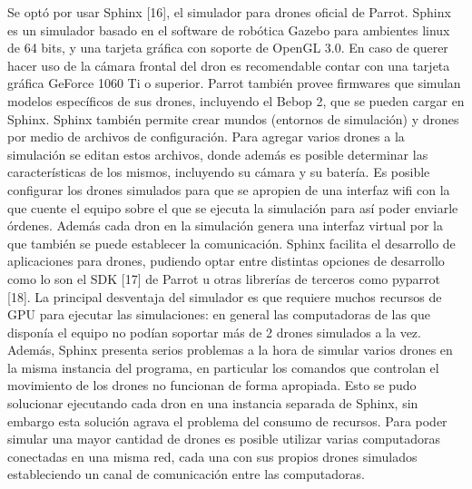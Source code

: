 Se optó por usar Sphinx [16], el simulador para drones oficial de Parrot. Sphinx es un simulador basado en el software de robótica Gazebo para ambientes linux de 64 bits, y una tarjeta gráfica con soporte de OpenGL 3.0. En caso de querer hacer uso de la cámara frontal del dron es recomendable contar con una tarjeta gráfica GeForce 1060 Ti o superior. Parrot también provee firmwares que simulan modelos específicos de sus drones, incluyendo el Bebop 2, que se pueden cargar en Sphinx.
Sphinx también permite crear mundos (entornos de simulación) y drones por medio de archivos de configuración. Para agregar varios drones a la simulación se editan estos archivos, donde además es posible determinar las características de los mismos, incluyendo su cámara y su batería.
Es posible configurar los drones simulados para que se apropien de una interfaz wifi con la que cuente el equipo sobre el que se ejecuta la simulación para así poder enviarle órdenes. Además cada dron en la simulación genera una interfaz virtual por la que también se puede establecer la comunicación.
Sphinx facilita el desarrollo de aplicaciones para drones, pudiendo optar entre distintas opciones de desarrollo como lo son el SDK [17] de Parrot u otras librerías de terceros como pyparrot [18].    
La principal desventaja del simulador es que requiere muchos recursos de GPU para ejecutar las simulaciones: en general las computadoras de las que disponía el equipo no podían soportar más de 2 drones simulados a la vez. Además, Sphinx presenta serios problemas a la hora de simular varios drones en la misma instancia del programa, en particular los comandos que controlan el movimiento de los drones no funcionan de forma apropiada. Esto se pudo solucionar ejecutando cada dron en una instancia separada de Sphinx, sin embargo esta solución agrava el problema del consumo de recursos.
Para poder simular una mayor cantidad de drones es posible utilizar varias computadoras conectadas en una misma red, cada una con sus propios drones simulados estableciendo un canal de comunicación entre las computadoras.